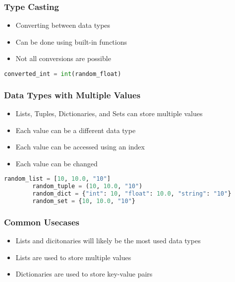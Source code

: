 \documentclass[serif, 9pt, aspectratio=32]{beamer}
\begin{document}
\begin{frame}
    \centering
    \frametitle{Type Casting}
    \begin{itemize}
        \setlength{\itemsep}{3em}
        \item Converting between data types
        \item Can be done using built-in functions
        \item Not all conversions are possible
    \end{itemize}
\end{frame}

\begin{frame}[fragile]
    \begin{lstlisting}[language=Python]
        converted_int = int(random_float)
    \end{lstlisting}
\end{frame}

\begin{frame}
    \centering
    \frametitle{Data Types with Multiple Values}
    \begin{itemize}
        \setlength{\itemsep}{3em}
        \item Lists, Tuples, Dictionaries, and Sets can store multiple values
        \item Each value can be a different data type
        \item Each value can be accessed using an index
        \item Each value can be changed
    \end{itemize}
\end{frame}

\begin{frame}[fragile]
    \begin{lstlisting}[language=Python]
        random_list = [10, 10.0, "10"]
        random_tuple = (10, 10.0, "10")
        random_dict = {"int": 10, "float": 10.0, "string": "10"}
        random_set = {10, 10.0, "10"}
    \end{lstlisting}
\end{frame}

\begin{frame}
    \centering
    \frametitle{Common Usecases}
    \begin{itemize}
        \setlength{\itemsep}{3em}
        \item Lists and dicitonaries will likely be the most used data types
        \item Lists are used to store multiple values
        \item Dictionaries are used to store key-value pairs
    \end{itemize}
\end{frame}
\end{document}
